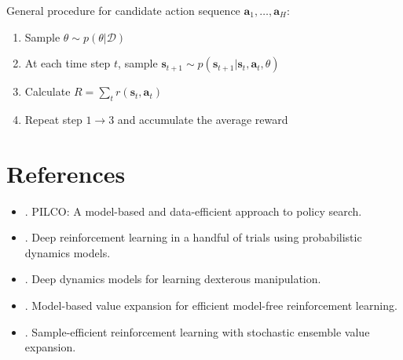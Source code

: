 General procedure for candidate action sequence $\textbf{a}_1,\dots, \textbf{a}_H$:
\begin{enumerate}
	\item Sample $\theta \sim p(\theta | \mathcal{D})$
	\item At each time step $t$, sample $\textbf{s}_{t+1} \sim p(\textbf{s}_{t+1} | \textbf{s}_t, \textbf{a}_t, \theta) $
	\item Calculate $R = \sum_{t} r(\textbf{s}_t, \textbf{a}_t)$
	\item Repeat step $1\rightarrow3$ and accumulate the average reward
\end{enumerate}

\section{References}
\begin{itemize}
	\item {}. PILCO: A model-based and data-efficient approach to policy search.
	\item {}. Deep reinforcement learning in a handful of trials using probabilistic dynamics models.
	\item {}. Deep dynamics models for learning dexterous manipulation.
	\item {}. Model-based value expansion for efficient model-free reinforcement learning.
	\item {}. Sample-efficient reinforcement learning with stochastic ensemble value expansion.
\end{itemize}